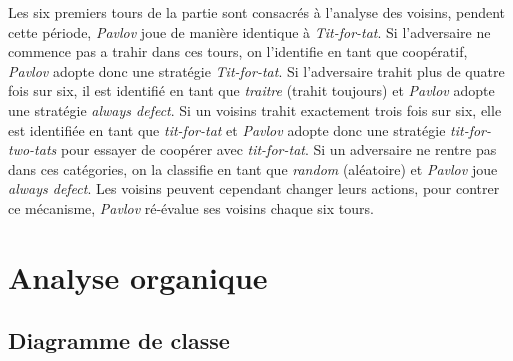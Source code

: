 \documentclass[a4paper]{article}
\begin{document}
Les six premiers tours de la partie sont consacrés à l'analyse des voisins, pendent cette période, \textit{Pavlov} joue de manière identique à \textit{Tit-for-tat}. Si l'adversaire ne commence pas a trahir dans ces tours, on l'identifie en tant que coopératif, \textit{Pavlov} adopte donc une stratégie \textit{Tit-for-tat}. Si l'adversaire trahit plus de quatre fois sur six, il est identifié en tant que \textit{traitre} (trahit toujours) et \textit{Pavlov} adopte une stratégie \textit{always defect}. Si un voisins trahit exactement trois fois sur six, elle est identifiée en tant que \textit{tit-for-tat} et \textit{Pavlov} adopte donc une stratégie \textit{tit-for-two-tats} pour essayer de coopérer avec \textit{tit-for-tat}. Si un adversaire ne rentre pas dans ces catégories, on la classifie en tant que \textit{random} (aléatoire) et \textit{Pavlov} joue \textit{always defect}. Les voisins peuvent cependant changer leurs actions, pour contrer ce mécanisme, \textit{Pavlov} ré-évalue ses voisins chaque six tours.

\pagebreak
\section{Analyse organique}
\subsection{Diagramme de classe}
\end{document}

